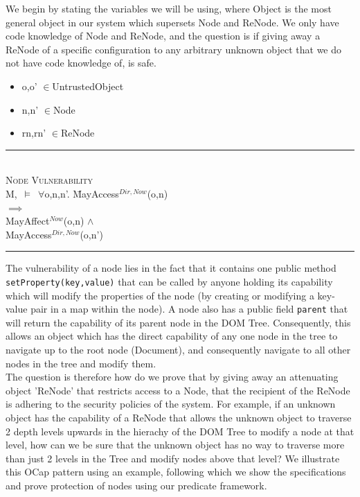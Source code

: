 \documentclass[a4paper,11pt, twoside,twocolumn]{article}
\newenvironment{logic}
{\begin{minipage}[c]{\linewidth}  \small \vspace{0.5em}\begin{tabbing}}
{\end{tabbing}\end{minipage}\vspace{0.5em}}
\newcommand{\loin}{$\in$}
\newcommand{\loforall}{$\forall$}
\newcommand{\loand}{$\land$}
\newcommand{\loimplies}{$\implies$}
\newcommand{\losigma}{\text{$\upsigma$}}
\newcommand{\loturns} {$\vDash$}
\newcommand{\hr}{\rule{\linewidth}{0.4pt}}
\begin{document}
We begin by stating the variables we will be using, where Object is the most general object in our system which supersets Node and ReNode. We only have code knowledge of Node and ReNode, and the question is if giving away a ReNode of a specific configuration to any arbitrary unknown object that we do not have code knowledge of, is safe.
\begin{itemize}
\item o,o' \loin UntrustedObject
\item n,n' \loin Node
\item rn,rn' \loin ReNode
\end{itemize}

\begin{logic}
\hr\\
\textsc{\normalsize *Node Vulnerability}\\
M,\losigma\ \loturns\ \loforall o,n,n'. \=MayAccess$^{Dir,Now}$(o,n)\\
\> \loimplies \\
\> MayAffect$^{Now}$(o,n) \loand \\
\> MayAccess$^{Dir,Now}$(o,n')\\
\hr
\end{logic}
The vulnerability of a node lies in the fact that it contains one public method \texttt{setProperty(key,value)} that can be called by anyone holding its capability which will modify the properties of the node (by creating or modifying a key-value pair in a map within the node). A node also has a public field \texttt{parent} that will return the capability of its parent node in the DOM Tree. Consequently, this allows an object which has the direct capability of any one node in the tree to navigate up to the root node (Document), and consequently navigate to all other nodes in the tree and modify them.\\

The question is therefore how do we prove that by giving away an attenuating object 'ReNode' that restricts access to a Node, that the recipient of the ReNode is adhering to the security policies of the system. For example, if an unknown object has the capability of a ReNode that allows the unknown object to traverse 2 depth levels upwards in the hierachy of the DOM Tree to modify a node at that level, how can we be sure that the unknown object has no way to traverse more than just 2 levels in the Tree and modify nodes above that level? We illustrate this OCap pattern using an example, following which we show the specifications and prove protection of nodes using our predicate framework.
\end{document}
